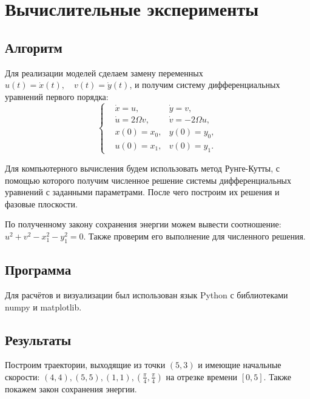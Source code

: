 \section{Вычислительные эксперименты}

    \subsection{Алгоритм}
        Для реализации моделей сделаем замену переменных \( u(t) = \dot{x}(t), \quad v(t) = \dot{y}(t) \), и получим систему дифференциальных уравнений первого порядка:
        \[
            \left\{\begin{split}
                & \dot{x} = u, & \dot{y} = v, \\
                & \dot{u} = 2 \Omega v, & \dot{v} = -2 \Omega u, \\
                & x(0) = x_0, & y(0) = y_0, \\
                & u(0) = x_1, & v(0) = y_1.
            \end{split}\right.
        \]

        Для компьютерного вычисления будем использовать метод Рунге-Кутты, с помощью которого получим численное решение системы дифференциальных уравнений с заданными параметрами. После чего построим их решения и фазовые плоскости.

        По полученному закону сохранения энергии можем вывести соотношение: \( u^2 + v^2 - x_1^2 - y_1^2 = 0 \). Также проверим его выполнение для численного решения.



    \subsection{Программа}
        Для расчётов и визуализации был использован язык Python с библиотеками numpy и matplotlib.

    \subsection{Результаты}
        Построим траектории, выходящие из точки \( (5, 3) \) и имеющие начальные скорости: \( (4, 4), (5, 5), (1, 1), \left(\frac{\pi}{4}, \frac{\pi}{4}\right) \) на отрезке времени \( [0, 5] \). Также покажем закон сохранения энергии.

